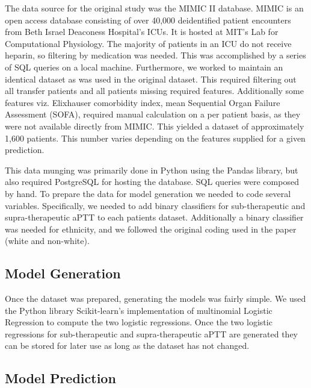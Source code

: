 \documentclass[12pt,a4paper,]{report}
\begin{document}
The data source for the original study was the MIMIC II database. MIMIC
is an open access database consisting of over 40,000 deidentified
patient encounters from Beth Israel Deaconess Hospital's ICUs. It is
hosted at MIT's Lab for Computational Physiology. The majority of
patients in an ICU do not receive heparin, so filtering by medication
was needed. This was accomplished by a series of SQL queries on a local
machine. Furthermore, we worked to maintain an identical dataset as was
used in the original dataset. This required filtering out all transfer
patients and all patients missing required features. Additionally some
features viz. Elixhauser comorbidity index, mean Sequential Organ
Failure Assessment (SOFA), required manual calculation on a per patient
basis, as they were not available directly from MIMIC. This yielded a
dataset of approximately 1,600 patients. This number varies depending on
the features supplied for a given prediction.

This data munging was primarily done in Python using the Pandas library,
but also required PostgreSQL for hosting the database. SQL queries were
composed by hand. To prepare the data for model generation we needed to
code several variables. Specifically, we needed to add binary
classifiers for sub-therapeutic and supra-therapeutic aPTT to each
patients dataset. Additionally a binary classifier was needed for
ethnicity, and we followed the original coding used in the paper (white
and non-white).

\subsection{Model Generation}\label{model-generation}

Once the dataset was prepared, generating the models was fairly simple.
We used the Python library Scikit-learn's implementation of multinomial
Logistic Regression to compute the two logistic regressions. Once the
two logistic regressions for sub-therapeutic and supra-therapeutic aPTT
are generated they can be stored for later use as long as the dataset
has not changed.

\subsection{Model Prediction}\label{model-prediction}
\end{document}
